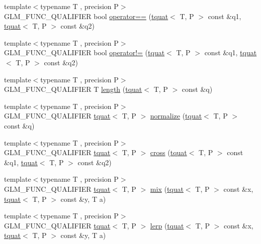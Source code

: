 \begin{DoxyCompactItemize}
\item 
{\footnotesize template$<$typename T , precision P$>$ }\\G\+L\+M\+\_\+\+F\+U\+N\+C\+\_\+\+Q\+U\+A\+L\+I\+F\+I\+E\+R bool \hyperlink{namespaceglm_aea4f3403a948c727fde4945f719913ea}{operator==} (\hyperlink{structglm_1_1tquat}{tquat}$<$ T, P $>$ const \&q1, \hyperlink{structglm_1_1tquat}{tquat}$<$ T, P $>$ const \&q2)
\item 
{\footnotesize template$<$typename T , precision P$>$ }\\G\+L\+M\+\_\+\+F\+U\+N\+C\+\_\+\+Q\+U\+A\+L\+I\+F\+I\+E\+R bool \hyperlink{namespaceglm_a5390634e3339760a2c04f6b1fabefd2e}{operator!=} (\hyperlink{structglm_1_1tquat}{tquat}$<$ T, P $>$ const \&q1, \hyperlink{structglm_1_1tquat}{tquat}$<$ T, P $>$ const \&q2)
\item 
{\footnotesize template$<$typename T , precision P$>$ }\\G\+L\+M\+\_\+\+F\+U\+N\+C\+\_\+\+Q\+U\+A\+L\+I\+F\+I\+E\+R T \hyperlink{group__gtc__quaternion_gac682181783027544c8d251b4d3a60cf8}{length} (\hyperlink{structglm_1_1tquat}{tquat}$<$ T, P $>$ const \&q)
\item 
{\footnotesize template$<$typename T , precision P$>$ }\\G\+L\+M\+\_\+\+F\+U\+N\+C\+\_\+\+Q\+U\+A\+L\+I\+F\+I\+E\+R \hyperlink{structglm_1_1tquat}{tquat}$<$ T, P $>$ \hyperlink{group__gtc__quaternion_ga35b6bcb22ac6d1e4a85440f5b69bdf86}{normalize} (\hyperlink{structglm_1_1tquat}{tquat}$<$ T, P $>$ const \&q)
\item 
{\footnotesize template$<$typename T , precision P$>$ }\\G\+L\+M\+\_\+\+F\+U\+N\+C\+\_\+\+Q\+U\+A\+L\+I\+F\+I\+E\+R \hyperlink{structglm_1_1tquat}{tquat}$<$ T, P $>$ \hyperlink{namespaceglm_ae21800a9767f21b7649c196485d924b4}{cross} (\hyperlink{structglm_1_1tquat}{tquat}$<$ T, P $>$ const \&q1, \hyperlink{structglm_1_1tquat}{tquat}$<$ T, P $>$ const \&q2)
\item 
{\footnotesize template$<$typename T , precision P$>$ }\\G\+L\+M\+\_\+\+F\+U\+N\+C\+\_\+\+Q\+U\+A\+L\+I\+F\+I\+E\+R \hyperlink{structglm_1_1tquat}{tquat}$<$ T, P $>$ \hyperlink{group__gtc__quaternion_ga31cc82178742c36450f5662bd4fb30b0}{mix} (\hyperlink{structglm_1_1tquat}{tquat}$<$ T, P $>$ const \&x, \hyperlink{structglm_1_1tquat}{tquat}$<$ T, P $>$ const \&y, T a)
\item 
{\footnotesize template$<$typename T , precision P$>$ }\\G\+L\+M\+\_\+\+F\+U\+N\+C\+\_\+\+Q\+U\+A\+L\+I\+F\+I\+E\+R \hyperlink{structglm_1_1tquat}{tquat}$<$ T, P $>$ \hyperlink{group__gtc__quaternion_ga5692804fa4db9e762a1c19b607e54435}{lerp} (\hyperlink{structglm_1_1tquat}{tquat}$<$ T, P $>$ const \&x, \hyperlink{structglm_1_1tquat}{tquat}$<$ T, P $>$ const \&y, T a)

\end{DoxyCompactItemize}
